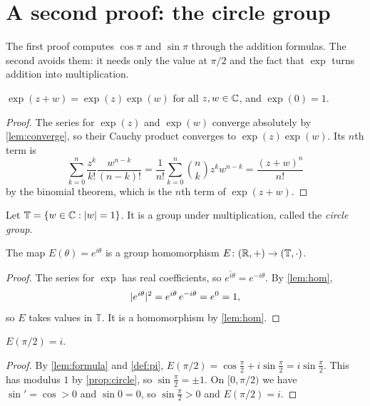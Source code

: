 \documentclass[11pt,a4paper]{article}
\begin{document}
\section{A second proof: the circle group}\label{sec:group}

The first proof computes $\cos\pi$ and $\sin\pi$ through the addition formulas. The
second avoids them: it needs only the value at $\pi/2$ and the fact that $\exp$ turns
addition into multiplication.

\begin{lemma}[Homomorphism]\label{lem:hom}
  $\exp(z + w) = \exp(z)\exp(w)$ for all $z, w \in \mathbb{C}$, and $\exp(0) = 1$.
\end{lemma}

\begin{proof}
  The series for $\exp(z)$ and $\exp(w)$ converge absolutely by \cref{lem:converge},
  so their Cauchy product converges to $\exp(z)\exp(w)$. Its $n$th term is
  \[
    \sum_{k=0}^{n} \frac{z^k}{k!} \frac{w^{n-k}}{(n-k)!}
    = \frac{1}{n!} \sum_{k=0}^{n} \binom{n}{k} z^k w^{n-k}
    = \frac{(z + w)^n}{n!}
  \]
  by the binomial theorem, which is the $n$th term of $\exp(z + w)$.
\end{proof}

Let $\mathbb{T} = \{w \in \mathbb{C} : \lvert w\rvert = 1\}$. It is a group under multiplication,
called the \emph{circle group}.

\begin{proposition}\label{prop:circle}
  The map $E(\theta) = e^{i\theta}$ is a group homomorphism
  $E \colon (\mathbb{R}, +) \to (\mathbb{T}, \cdot)$.
\end{proposition}

\begin{proof}
  The series for $\exp$ has real coefficients, so
  $\overline{e^{i\theta}} = e^{-i\theta}$. By \cref{lem:hom},
  \[
    \lvert e^{i\theta}\rvert^2 = e^{i\theta}\, e^{-i\theta} = e^{0} = 1,
  \]
  so $E$ takes values in $\mathbb{T}$. It is a homomorphism by \cref{lem:hom}.
\end{proof}

\begin{lemma}\label{lem:quarter}
  $E(\pi/2) = i$.
\end{lemma}

\begin{proof}
  By \cref{lem:formula} and \cref{def:pi},
  $E(\pi/2) = \cos\frac\pi2 + i \sin\frac\pi2 = i \sin\frac\pi2$. This has modulus
  $1$ by \cref{prop:circle}, so $\sin\frac\pi2 = \pm 1$. On $[0, \pi/2)$ we have
  $\sin' = \cos > 0$ and $\sin 0 = 0$, so $\sin\frac\pi2 > 0$ and $E(\pi/2) = i$.
\end{proof}
\end{document}
